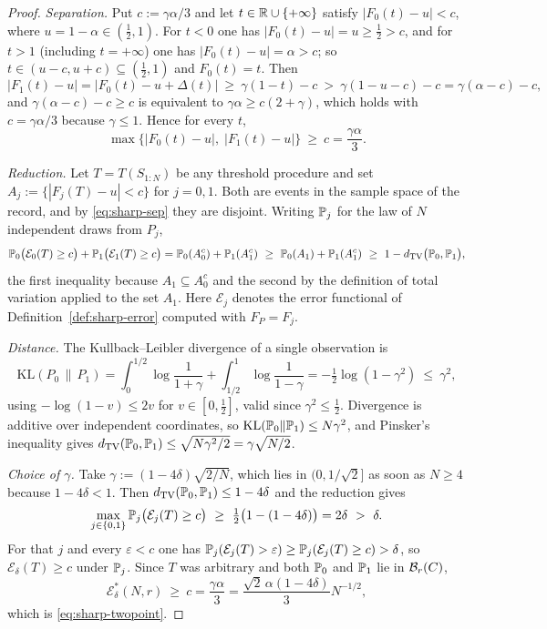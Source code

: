 \documentclass[../../../main.tex]{subfiles}
\begin{document}
\begin{proof}
\emph{Separation.} Put $c:=\gamma\alpha/3$ and let $t\in\mathbb{R}\cup\{+\infty\}$ satisfy $|F_0(t)-u|<c$, where $u=1-\alpha\in(\tfrac12,1)$. For $t<0$ one has $|F_0(t)-u|=u\ge\tfrac12>c$, and for $t>1$ (including $t=+\infty$) one has $|F_0(t)-u|=\alpha>c$; so $t\in(u-c,u+c)\subseteq(\tfrac12,1)$ and $F_0(t)=t$. Then
\[
|F_1(t)-u|=\big|F_0(t)-u+\Delta(t)\big|\ \ge\ \gamma(1-t)-c\ >\ \gamma(1-u-c)-c=\gamma(\alpha-c)-c ,
\]
and $\gamma(\alpha-c)-c\ge c$ is equivalent to $\gamma\alpha\ge c(2+\gamma)$, which holds with $c=\gamma\alpha/3$ because $\gamma\le1$. Hence for every $t$,
\begin{equation}\label{eq:sharp-sep}
\max\big\{|F_0(t)-u|,\;|F_1(t)-u|\big\}\ \ge\ c=\frac{\gamma\alpha}3 .
\end{equation}

\emph{Reduction.} Let $T=T(S_{1:N})$ be any threshold procedure and set $A_j:=\{|F_j(T)-u|<c\}$ for $j=0,1$. Both are events in the sample space of the record, and by \eqref{eq:sharp-sep} they are disjoint. Writing $\mathbb{P}_j$ for the law of $N$ independent draws from $P_j$,
\[
\Prob_0\big(\mathcal E_0(T)\ge c\big)+\Prob_1\big(\mathcal E_1(T)\ge c\big)=\Prob_0(A_0^c)+\Prob_1(A_1^c)\ \ge\ \Prob_0(A_1)+\Prob_1(A_1^c)\ \ge\ 1-\dTV\big(\Prob_0,\Prob_1\big),
\]
the first inequality because $A_1\subseteq A_0^c$ and the second by the definition of total variation applied to the set $A_1$. Here $\mathcal E_j$ denotes the error functional of Definition~\ref{def:sharp-error} computed with $F_P=F_j$.

\emph{Distance.} The Kullback--Leibler divergence of a single observation is
\[
\mathrm{KL}(P_0\,\|\,P_1)=\int_0^{1/2}\log\frac1{1+\gamma}+\int_{1/2}^1\log\frac1{1-\gamma}=-\tfrac12\log(1-\gamma^2)\ \le\ \gamma^2 ,
\]
using $-\log(1-v)\le2v$ for $v\in[0,\tfrac12]$, valid since $\gamma^2\le\tfrac12$. Divergence is additive over independent coordinates, so $\mathrm{KL}(\mathbb{P}_0\|\mathbb{P}_1)\le N\gamma^2$, and Pinsker's inequality \citep[\S2.4.1]{tsybakov2009} gives $d_{\mathrm{TV}}(\mathbb{P}_0,\mathbb{P}_1)\le\sqrt{N\gamma^2/2}=\gamma\sqrt{N/2}$.

\emph{Choice of $\gamma$.} Take $\gamma:=(1-4\delta)\sqrt{2/N}$, which lies in $(0,1/\sqrt2]$ as soon as $N\ge4$ because $1-4\delta<1$. Then $d_{\mathrm{TV}}(\mathbb{P}_0,\mathbb{P}_1)\le1-4\delta$ and the reduction gives
\[
\max_{j\in\{0,1\}}\mathbb{P}_j\big(\mathcal E_j(T)\ge c\big)\ \ge\ \tfrac12\big(1-(1-4\delta)\big)=2\delta\ >\ \delta .
\]
For that $j$ and every $\varepsilon<c$ one has $\mathbb{P}_j(\mathcal E_j(T)>\varepsilon)\ge\mathbb{P}_j(\mathcal E_j(T)\ge c)>\delta$, so $\mathcal E_\delta(T)\ge c$ under $\mathbb{P}_j$. Since $T$ was arbitrary and both $\mathbb{P}_0$ and $\mathbb{P}_1$ lie in $\mathcal B_{r}(C)$,
\[
\mathcal E^*_\delta(N,r)\ \ge\ c=\frac{\gamma\alpha}3=\frac{\sqrt2\,\alpha(1-4\delta)}3N^{-1/2} ,
\]
which is \eqref{eq:sharp-twopoint}.


\end{proof}
\end{document}
